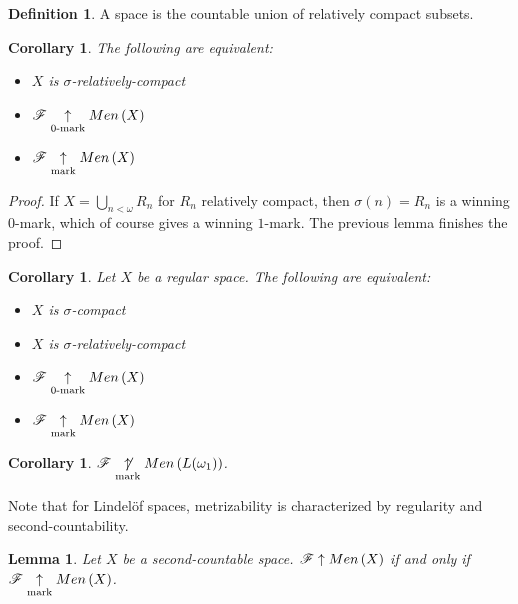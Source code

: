 \documentclass{amsart}
\newtheorem{lemma}[theorem]{Lemma}
\newtheorem{corollary}[theorem]{Corollary}
\theoremstyle{definition}
\newtheorem{definition}[theorem]{Definition}
\begin{document}
\begin{definition}
  A  space is the countable union of
  relatively compact subsets.
\end{definition}

\begin{corollary}
  The following are equivalent:
  \begin{itemize}
    \item \(X\) is \(\sigma\)-relatively-compact
    \item \(\mathscr{F} \underset{0\text{-mark}}{\uparrow} Men\left({X}\right)\)
    \item \(\mathscr{F} \underset{\text{mark}}{\uparrow} Men\left({X}\right)\)
  \end{itemize}
\end{corollary}

\begin{proof}
  If \(X=\bigcup_{n<\omega} R_n\) for \(R_n\) relatively compact, then
  \(\sigma(n)=R_n\) is a winning \(0\)-mark, which of course gives a
  winning \(1\)-mark. The previous lemma finishes the proof.
\end{proof}

\begin{corollary}
  Let \(X\) be a regular space. The following are equivalent:
  \begin{itemize}
    \item \(X\) is \(\sigma\)-compact
    \item \(X\) is \(\sigma\)-relatively-compact
    \item \(\mathscr{F} \underset{0\text{-mark}}{\uparrow} Men\left({X}\right)\)
    \item \(\mathscr{F} \underset{\text{mark}}{\uparrow} Men\left({X}\right)\)
  \end{itemize}
\end{corollary}

\begin{corollary}
  \(\mathscr{F}\underset{\text{mark}}{\not\uparrow}Men\left({L(\omega_1)}\right)\).
\end{corollary}

Note that for Lindel\"of spaces, metrizability is characterized by regularity
and second-countability.

\begin{lemma}
  Let \(X\) be a second-countable space. \(\mathscr{F}\uparrow Men\left({X}\right)\) if and only if
  \(\mathscr{F}\underset{\text{mark}}{\uparrow}Men\left({X}\right)\).
\end{lemma}
\end{document}
